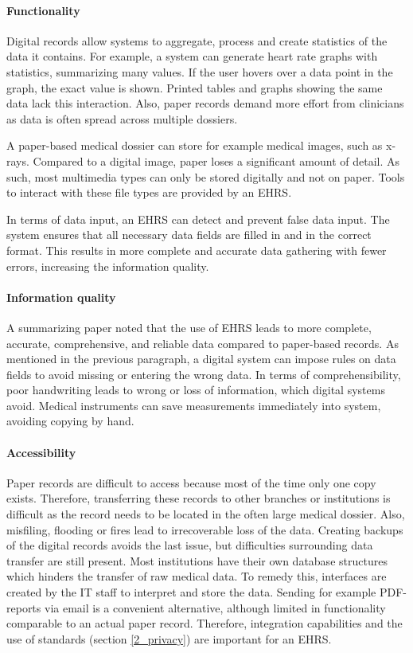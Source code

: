     \paragraph{Functionality} Digital records allow systems to aggregate, process and create statistics of the data it contains. For example, a system can generate heart rate graphs with statistics, summarizing many values. If the user hovers over a data point in the graph, the exact value is shown. Printed tables and graphs showing the same data lack this interaction. Also, paper records demand more effort from clinicians as data is often spread across multiple dossiers.

    A paper-based medical dossier can store for example medical images, such as x-rays. Compared to a digital image, paper loses a significant amount of detail. As such, most multimedia types can only be stored digitally and not on paper. Tools to interact with these file types are provided by an EHRS\@.

    In terms of data input, an EHRS can detect and prevent false data input. The system ensures that all necessary data fields are filled in and in the correct format. This results in more complete and accurate data gathering with fewer errors, increasing the information quality.

    \paragraph{Information quality} A summarizing paper noted that the use of EHRS leads to more complete, accurate, comprehensive, and reliable data compared to paper-based records\cite{ehrs_summary}. As mentioned in the previous paragraph, a digital system can impose rules on data fields to avoid missing or entering the wrong data. In terms of comprehensibility, poor handwriting leads to wrong or loss of information, which digital systems avoid. Medical instruments can save measurements immediately into system, avoiding copying by hand.

    \paragraph{Accessibility} Paper records are difficult to access because most of the time only one copy exists. Therefore, transferring these records to other branches or institutions is difficult as the record needs to be located in the often large medical dossier. Also, misfiling, flooding or fires lead to irrecoverable loss of the data. Creating backups of the digital records avoids the last issue, but difficulties surrounding data transfer are still present. Most institutions have their own database structures which hinders the transfer of raw medical data. To remedy this, interfaces are created by the IT staff to interpret and store the data. Sending for example PDF-reports via email is a convenient alternative, although limited in functionality comparable to an actual paper record. Therefore, integration capabilities and the use of standards (section \ref{2_privacy}) are important for an EHRS\@. %

